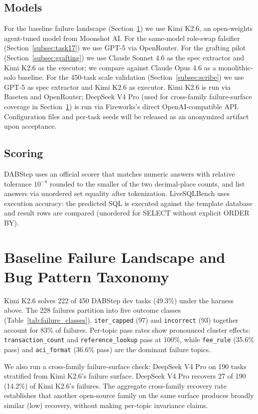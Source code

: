 \documentclass[conference]{IEEEtran}
\newcommand{\Kimi}{Kimi K2.6}
\newcommand{\DeepSeek}{DeepSeek V4 Pro}
\newcommand{\Opus}{Claude Opus 4.6}
\newcommand{\Sonnet}{Claude Sonnet 4.6}
\begin{document}
\subsection{Models}
For the baseline failure landscape (Section~\ref{sec:landscape}) we use \Kimi{}, an open-weights agent-tuned model from Moonshot AI. For the same-model role-swap falsifier (Section~\ref{subsec:task17}) we use GPT-5 via OpenRouter. For the grafting pilot (Section~\ref{subsec:grafting}) we use \Sonnet{} as the spec extractor and \Kimi{} as the executor; we compare against \Opus{} as a monolithic-solo baseline. For the 450-task scale validation (Section~\ref{subsec:scribe}) we use GPT-5 as spec extractor and \Kimi{} as executor. \Kimi{} is run via Baseten and OpenRouter; \DeepSeek{} (used for cross-family failure-surface coverage in Section~\ref{sec:landscape}) is run via Fireworks's direct OpenAI-compatible API. Configuration files and per-task seeds will be released as an anonymized artifact upon acceptance.

\subsection{Scoring}
DABStep uses an official scorer that matches numeric answers with relative tolerance $10^{-4}$ rounded to the smaller of the two decimal-place counts, and list answers via unordered set equality after tokenization. LiveSQLBench uses execution accuracy: the predicted SQL is executed against the template database and result rows are compared (unordered for SELECT without explicit ORDER BY).

\section{Baseline Failure Landscape and Bug Pattern Taxonomy}
\label{sec:landscape}

\Kimi{} solves 222 of 450 DABStep dev tasks (49.3\%) under the harness above. The 228 failures partition into five outcome classes (Table~\ref{tab:failure_classes}). \texttt{iter\_capped} (97) and \texttt{incorrect} (93) together account for 83\% of failures. Per-topic pass rates show pronounced cluster effects: \texttt{transaction\_count} and \texttt{reference\_lookup} pass at 100\%, while \texttt{fee\_rule} (35.6\% pass) and \texttt{aci\_format} (36.6\% pass) are the dominant failure topics.

We also run a cross-family failure-surface check: \DeepSeek{} on 190 tasks stratified from \Kimi{}'s failure surface. \DeepSeek{} recovers 27 of 190 (14.2\%) of \Kimi{}'s failures. The aggregate cross-family recovery rate establishes that another open-source family on the same surface produces broadly similar (low) recovery, without making per-topic invariance claims.
\end{document}
